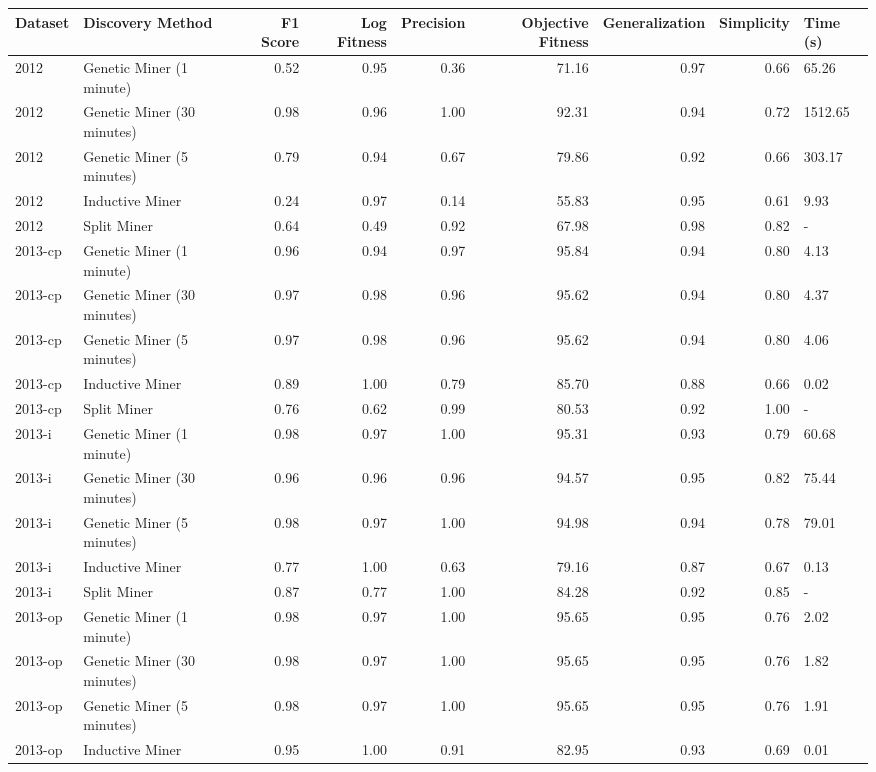 \begin{tabular}{llrrrrrrl}
\toprule
Dataset & Discovery Method & F1 Score & Log Fitness & Precision & Objective Fitness & Generalization & Simplicity & Time (s) \\
\midrule
2012 & Genetic Miner (1 minute) & 0.52 & 0.95 & 0.36 & 71.16 & 0.97 & 0.66 & 65.26 \\
2012 & Genetic Miner (30 minutes) & 0.98 & 0.96 & 1.00 & 92.31 & 0.94 & 0.72 & 1512.65 \\
2012 & Genetic Miner (5 minutes) & 0.79 & 0.94 & 0.67 & 79.86 & 0.92 & 0.66 & 303.17 \\
2012 & Inductive Miner & 0.24 & 0.97 & 0.14 & 55.83 & 0.95 & 0.61 & 9.93 \\
2012 & Split Miner & 0.64 & 0.49 & 0.92 & 67.98 & 0.98 & 0.82 & - \\
2013-cp & Genetic Miner (1 minute) & 0.96 & 0.94 & 0.97 & 95.84 & 0.94 & 0.80 & 4.13 \\
2013-cp & Genetic Miner (30 minutes) & 0.97 & 0.98 & 0.96 & 95.62 & 0.94 & 0.80 & 4.37 \\
2013-cp & Genetic Miner (5 minutes) & 0.97 & 0.98 & 0.96 & 95.62 & 0.94 & 0.80 & 4.06 \\
2013-cp & Inductive Miner & 0.89 & 1.00 & 0.79 & 85.70 & 0.88 & 0.66 & 0.02 \\
2013-cp & Split Miner & 0.76 & 0.62 & 0.99 & 80.53 & 0.92 & 1.00 & - \\
2013-i & Genetic Miner (1 minute) & 0.98 & 0.97 & 1.00 & 95.31 & 0.93 & 0.79 & 60.68 \\
2013-i & Genetic Miner (30 minutes) & 0.96 & 0.96 & 0.96 & 94.57 & 0.95 & 0.82 & 75.44 \\
2013-i & Genetic Miner (5 minutes) & 0.98 & 0.97 & 1.00 & 94.98 & 0.94 & 0.78 & 79.01 \\
2013-i & Inductive Miner & 0.77 & 1.00 & 0.63 & 79.16 & 0.87 & 0.67 & 0.13 \\
2013-i & Split Miner & 0.87 & 0.77 & 1.00 & 84.28 & 0.92 & 0.85 & - \\
2013-op & Genetic Miner (1 minute) & 0.98 & 0.97 & 1.00 & 95.65 & 0.95 & 0.76 & 2.02 \\
2013-op & Genetic Miner (30 minutes) & 0.98 & 0.97 & 1.00 & 95.65 & 0.95 & 0.76 & 1.82 \\
2013-op & Genetic Miner (5 minutes) & 0.98 & 0.97 & 1.00 & 95.65 & 0.95 & 0.76 & 1.91 \\
2013-op & Inductive Miner & 0.95 & 1.00 & 0.91 & 82.95 & 0.93 & 0.69 & 0.01 \\

\end{tabular}
